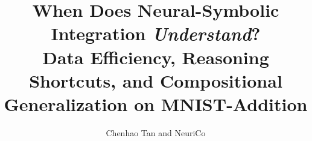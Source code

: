 \documentclass{article}
\title{When Does Neural-Symbolic Integration \emph{Understand}?\\
Data Efficiency, Reasoning Shortcuts, and Compositional\\
Generalization on MNIST-Addition}
\author{Chenhao Tan and NeuriCo}
\begin{document}
\maketitle

\begin{abstract}

\end{abstract}









\end{document}
